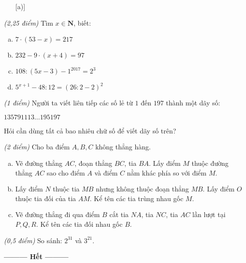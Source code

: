 \begin{ex}
\begin{enumerate} [a)]
\end{enumerate}
\end{ex}    \begin{ex}  \textit{(2,25 điểm)} Tìm $x \in  \mathbf{N}$, biết:
 \begin{enumerate}[a)]
 \item $7\cdot \left( 53-x \right)=217$ 
\item $232-9\cdot \left( x+4 \right)=97$ 
\item $108:\left( 5x-3 \right)-{{1}^{2017}}={{2}^{3}}$ 
\item ${{5}^{x+1}}-48:12={{\left( 26:2-2 \right)}^{2}}$ 
\end{enumerate}
\end{ex}    \begin{ex}  \textit{(1 điểm)} Người ta viết liên tiếp các số lẻ từ $1$ đến $197$ thành một dãy số:
\begin{center}
$135791113…195197$
\end{center}
Hỏi cần dùng tất cả bao nhiêu chữ số để viết dãy số trên?\\
\end{ex}    \begin{ex}  \textit{(2 điểm)} Cho ba điểm $A, B, C$ không thẳng hàng.
 \begin{enumerate}[a)]
 \item Vẽ đường thẳng $AC$, đoạn thẳng $BC$, tia $BA$. Lấy điểm $M$ thuộc đường thẳng $AC$ sao cho điểm $A$ và điểm $C$ nằm khác phía so với điểm $M$.
\item Lấy điểm $N$ thuộc tia $MB$ nhưng không thuộc đoạn thẳng $MB$. Lấy điểm $O$ thuộc tia đối của tia $AM$. Kể tên các tia trùng nhau gốc $M$.
\item Vẽ đường thẳng đi qua điểm $B$ cắt tia $NA$, tia $NC$, tia $AC$ lần lượt tại $P,Q, R$. Kể tên các tia đối nhau gốc $B$.
\end{enumerate}
\end{ex}    \begin{ex} \textit{(0,5 điểm)} So sánh: ${{2}^{31}}$ và ${{3}^{21}}$. 
\end{ex}
\begin{center}
\textbf{\textbf{---------} Hết \textbf{---------}}
\end{center}